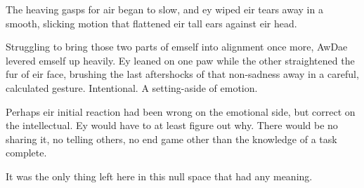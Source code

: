 The heaving gasps for air began to slow, and ey wiped eir tears away in a smooth, slicking motion that flattened eir tall ears against eir head.

Struggling to bring those two parts of emself into alignment once more, AwDae levered emself up heavily. Ey leaned on one paw while the other straightened the fur of eir face, brushing the last aftershocks of that non-sadness away in a careful, calculated gesture. Intentional. A setting-aside of emotion.

Perhaps eir initial reaction had been wrong on the emotional side, but correct on the intellectual. Ey would have to at least figure out why. There would be no sharing it, no telling others, no end game other than the knowledge of a task complete.

It was the only thing left here in this null space that had any meaning.
